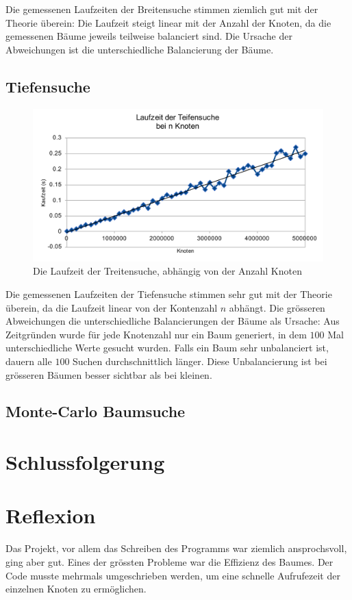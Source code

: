\documentclass[a4paper,11pt]{article}
\begin{document}
Die gemessenen Laufzeiten der Breitensuche stimmen ziemlich gut mit der Theorie überein: Die Laufzeit steigt linear mit der Anzahl der Knoten, da die gemessenen Bäume jeweils teilweise balanciert sind. Die Ursache der Abweichungen ist die unterschiedliche Balancierung der Bäume.
\subsection{Tiefensuche}

	\begin{figure}[ht]
		\centering
		\includegraphics[width=0.85\linewidth]{img/DFS_size.pdf}
		\caption{Die Laufzeit der Treitensuche, abhängig von der Anzahl Knoten}
	\end{figure}
	
Die gemessenen Laufzeiten der Tiefensuche stimmen sehr gut mit der Theorie überein, da die Laufzeit linear von der Kontenzahl $n$ abhängt. Die grösseren Abweichungen die unterschiedliche Balancierungen der Bäume als Ursache: Aus Zeitgründen wurde für jede Knotenzahl nur ein Baum generiert, in dem $100$ Mal unterschiedliche Werte gesucht wurden. Falls ein Baum sehr unbalanciert ist, dauern alle $100$ Suchen durchschnittlich länger. Diese Unbalancierung ist bei grösseren Bäumen besser sichtbar als bei kleinen.

\subsection{Monte-Carlo Baumsuche}

\section{Schlussfolgerung}
\section{Reflexion}
Das Projekt, vor allem das Schreiben des Programms war ziemlich ansprochsvoll, ging aber gut. Eines der grössten Probleme war die Effizienz des Baumes. Der Code musste mehrmals umgeschrieben werden, um eine schnelle Aufrufezeit der einzelnen Knoten zu ermöglichen.
\end{document}
